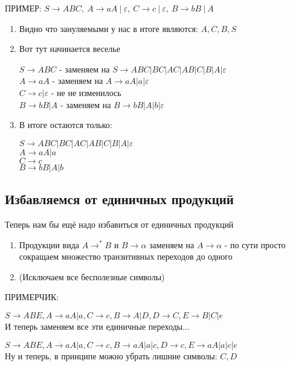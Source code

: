 \documentclass{article}
\begin{document}
ПРИМЕР:
$S \to ABC, \ A \to aA \ | \ \varepsilon, \ C \to c \ | \ \varepsilon, \ B \to bB \ | \ A$
\begin{enumerate}
  \item Видно что зануляемыми у нас в итоге являются: $A, C, B, S$
    \item Вот тут начинается веселье

        $ S \to ABC $ - заменяем на $ S \to ABC | BC | AC | AB | C | B | A | \varepsilon $ \\
        $ A \to aA $ - заменяем на $ A \to aA|a|\varepsilon $ \\
        $ C \to c| \varepsilon $  - не не изменилось\\
        $ B \to bB|A $ - заменяем на $ B \to bB|A|b|\varepsilon $ \\
    \item В итоге остаются только:

        $ S \to ABC | BC | AC | AB | C | B | A | \varepsilon $ \\
        $ A \to aA|a $ \\
        $ C \to c $\\
        $ B \to bB|A|b $ \\
\end{enumerate}

\subsection{Избавляемся от единичных продукций}
Теперь нам бы ещё надо избавиться от единичных продукций
\begin{enumerate}
  \item Продукции вида $ A \to^* B$ и $B \to \alpha $ заменяем на $ A \to \alpha $ - по сути просто сокращаем множество транзитивных переходов до одного
    \item (Исключаем все бесполезные символы)
\end{enumerate}

ПРИМЕРЧИК:

$ S \to ABE, A \to aA | a, C \to c, B \to A | D, D \to C, E \to B | C | e $ \\

И теперь заменяем все эти единичные переходы...

$ S \to ABE, A \to aA | a, C \to c, B \to aA | a | c, D \to c, E \to aA | a|c |e $ \\

Ну и теперь, в принципе можно убрать лишние символы: $C, D$
\end{document}
